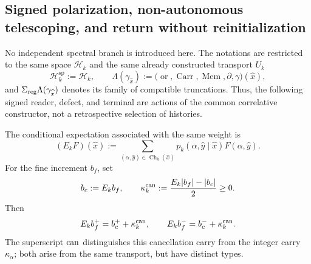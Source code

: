 \subsection{Signed polarization, non-autonomous telescoping, and return without reinitialization}
No independent spectral branch is introduced here. The notations are
restricted to the same space \(\mathscr H_k\) and the same already constructed
transport \(U_k\)
\[
 \mathcal H_k^{\mathrm{sp}}:=\mathscr H_k,
 \qquad
 \Lambda(\gamma_{\widehat x})
 :=\bigl(\operatorname{or},\operatorname{Carr},\operatorname{Mem},
          \partial,\gamma\bigr)(\widehat x),
\]
and \(\Sigma_{\rm reg}\Lambda(\gamma_{\widehat x})\) denotes its family of
compatible truncations. Thus, the following signed reader, defect, and
terminal are actions of the common correlative constructor, not a
retrospective selection of histories.
\begingroup
  \let\section\subsection
  
  
\endgroup

The conditional expectation associated with the same weight is
\begin{equation}
\label{eq:pdfv2-cor-esperanza-comun}
 (E_kF)(\widehat x):=
 \sum_{(\alpha,\widehat y)\in\operatorname{Ch}_k(\widehat x)}
 p_k(\alpha,\widehat y\mid\widehat x)F(\alpha,\widehat y).
\end{equation}
For the fine increment \(b_f\), set
\begin{equation}
\label{eq:pdfv2-cor-kappa-jensen}
 b_c:=E_kb_f,\qquad
 \kappa_k^{\rm can}:=\frac{E_k|b_f|-|b_c|}{2}\geq0.
\end{equation}
Then
\begin{equation}
\label{eq:pdfv2-cor-jensen-hojas}
 E_kb_f^+=b_c^++\kappa_k^{\rm can},\qquad
 E_kb_f^-=b_c^-+\kappa_k^{\rm can}.
\end{equation}
The superscript \({\rm can}\) distinguishes this cancellation carry from the integer
carry \(\kappa_\alpha\); both arise from the same transport, but have
distinct types.


